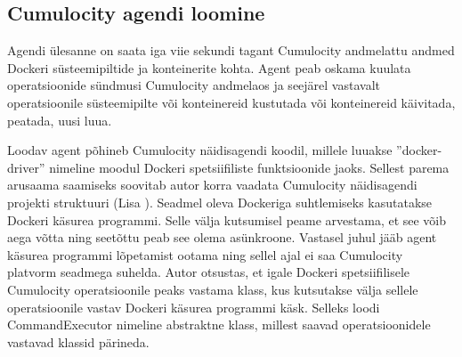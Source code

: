\documentclass[12pt]{article}
\begin{document}
  \FloatBarrier
 
 
   
 
 
 
  
 
 
 
 
 
 
  \subsection{Cumulocity agendi loomine}
  Agendi ülesanne on saata iga viie sekundi tagant Cumulocity andmelattu andmed
  Dockeri süsteemipiltide ja konteinerite kohta. Agent peab oskama kuulata
  operatsioonide sündmusi Cumulocity andmelaos ja seejärel vastavalt operatsioonile
  süsteemipilte või konteinereid kustutada või konteinereid käivitada, peatada, uusi luua.
 
  Loodav agent põhineb Cumulocity näidisagendi koodil, millele luuakse ''docker-driver''
  nimeline moodul Dockeri spetsiifiliste
  funktsioonide jaoks. Sellest parema arusaama saamiseks soovitab autor korra vaadata
  Cumulocity näidisagendi projekti struktuuri (Lisa ).
  Seadmel oleva Dockeriga suhtlemiseks kasutatakse Dockeri käsurea
  programmi.
  Selle välja kutsumisel peame arvestama, et see võib aega võtta ning
  seetõttu peab see olema asünkroone.
  Vastasel juhul jääb agent käsurea programmi lõpetamist ootama ning sellel ajal ei saa Cumulocity
  platvorm seadmega suhelda. Autor otsustas, et igale Dockeri spetsiifilisele Cumulocity
  operatsioonile peaks vastama klass, kus kutsutakse välja sellele operatsioonile vastav
  Dockeri käsurea programmi käsk. Selleks loodi CommandExecutor nimeline abstraktne klass,
  millest saavad operatsioonidele vastavad klassid pärineda.
 
 
 
 
\end{document}
